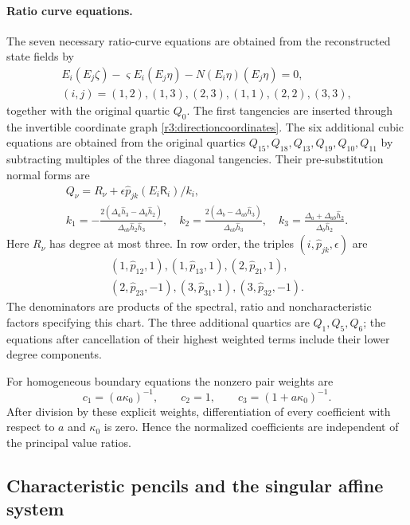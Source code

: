 \documentclass[11pt,a4paper]{article}
\numberwithin{equation}{section}
\theoremstyle{plain}
\theoremstyle{definition}
\theoremstyle{remark}
\begin{document}
\paragraph{Ratio curve equations.}
The seven necessary ratio-curve equations are obtained from the reconstructed state fields by
\[
 \begin{gathered}
 E_i(E_j\zeta )-\varsigma  E_i(E_j\eta )-N(E_i\eta )(E_j\eta )=0,\\
 (i,j)=(1,2),(1,3),(2,3),(1,1),(2,2),(3,3),
 \end{gathered}
\]
together with the original quartic \(Q_0\). The first tangencies are
inserted through the invertible coordinate graph
\eqref{r3:directioncoordinates}. The six additional cubic equations are obtained from the original quartics
\(Q_{15},Q_{18},Q_{13},Q_{19},Q_{10},Q_{11}\) by subtracting multiples of
the three diagonal tangencies. Their pre-substitution normal forms are
\[
 \begin{gathered}
 Q_{\nu}=R_{\nu}+\epsilon \widehat p_{jk}(E_i\mathsf R_i)/k_i,\\
 k_1=-\frac{2(\Delta_a\widehat h_3 -\Delta_b\widehat h_2 )}{\Delta_{ab}\widehat h_2 \widehat h_3 },\quad
 k_2=\frac{2(\Delta_b-\Delta_{ab}\widehat h_3 )}{\Delta_{ab}\widehat h_3 },\quad
 k_3=\frac{\Delta_a+\Delta_{ab}\widehat h_2 }{\Delta_b\widehat h_2 }.
 \end{gathered}
\]
Here \(R_\nu\) has degree at most three.  In row order, the triples
\((i,\widehat p_{jk},\epsilon)\) are
\[
 \begin{gathered}
 (1,\widehat p_{12},1),(1,\widehat p_{13},1),(2,\widehat p_{21},1),\\
 (2,\widehat p_{23},-1),(3,\widehat p_{31},1),(3,\widehat p_{32},-1).
 \end{gathered}
\]
The denominators are products of the spectral, ratio and noncharacteristic
factors specifying this chart.  The three additional quartics
are \(Q_1,Q_5,Q_6\); the equations after cancellation of their highest weighted terms
include their lower degree components.

For homogeneous boundary equations the nonzero pair weights are
\[
 c_1=(a\kappa_0 )^{-1},\qquad c_2=1,\qquad c_3=(1+a\kappa_0 )^{-1}.
\]
After division by these explicit weights, differentiation of every
coefficient with respect to \(a\) and \(\kappa_0 \) is zero.  Hence the normalized coefficients are independent of the principal
value ratios.

\subsection{Characteristic pencils and the singular affine system}
\label{appr3fib:pencils}
\end{document}
